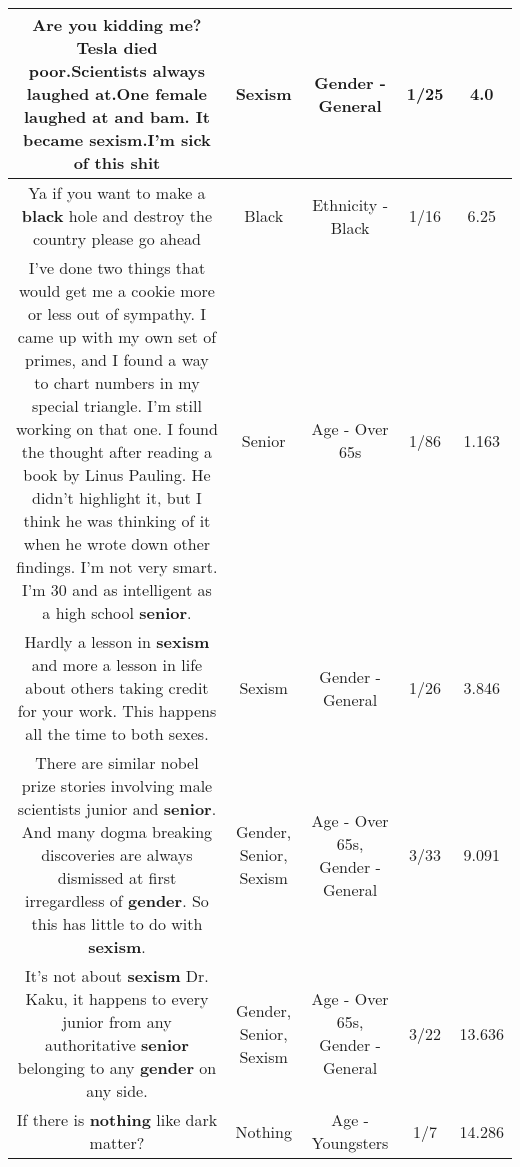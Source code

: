 \documentclass[11pt]{article}
\newlength\mylength
\begin{document}
\begin{center}
\begin{longtable}{|C{.65\mylength}|C{.30\mylength}|C{.12\mylength}|C{.12\mylength}|C{.12\mylength}|}
  \small Are you kidding me?Tesla died poor.Scientists always laughed at.One female laughed at and bam. It became \textbf{sexism}.I'm sick of this shit\normalsize   & Sexism & Gender - General & 1/25 & 4.0 \\  \hline
  \small Ya if you want to make a \textbf{black} hole and destroy the country  please go ahead\normalsize   & Black & Ethnicity - Black & 1/16 & 6.25 \\  \hline
  \small I've done two things that would get me a cookie more or less out of sympathy.  I came up with my own set of primes, and I found a way to chart numbers in my special triangle.  I'm still working on that one.  I found the thought after reading a book by Linus Pauling.  He didn't highlight it, but I think he was thinking of it when he wrote down other findings.  I'm not very smart.  I'm 30 and as intelligent as a high school \textbf{senior}.\normalsize   & Senior & Age - Over 65s & 1/86 & 1.163 \\  \hline
  \small Hardly a lesson in \textbf{sexism} and more a lesson in life about others taking credit for your work. This happens all the time to both sexes.\normalsize   & Sexism & Gender - General & 1/26 & 3.846 \\  \hline
  \small There are similar nobel prize stories involving male scientists junior and \textbf{senior}. And many dogma breaking discoveries are always dismissed at first irregardless of \textbf{gender}. So this has little to do with \textbf{sexism}.\normalsize   & Gender, Senior, Sexism & Age - Over 65s, Gender - General & 3/33 & 9.091 \\  \hline
  \small It's not about \textbf{sexism} Dr. Kaku, it happens to every junior from any authoritative \textbf{senior} belonging to any \textbf{gender} on any side.\normalsize   & Gender, Senior, Sexism & Age - Over 65s, Gender - General & 3/22 & 13.636 \\  \hline
  \small If there is \textbf{nothing} like dark matter?\normalsize   & Nothing & Age - Youngsters & 1/7 & 14.286 \\  \hline

\end{longtable}
\end{center}
\end{document}
